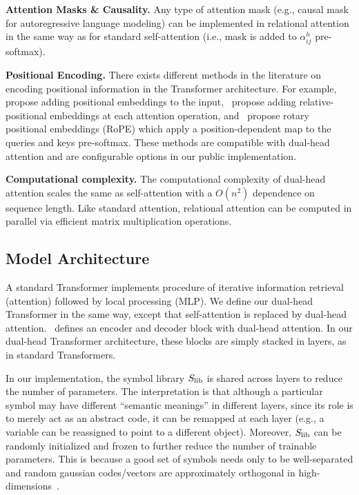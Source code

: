\textbf{Attention Masks \& Causality.} Any type of attention mask (e.g., causal mask for autoregressive language modeling) can be implemented in relational attention in the same way as for standard self-attention (i.e., mask is added to $\alpha_{ij}^h$ pre-softmax).

\textbf{Positional Encoding.} There exists different methods in the literature on encoding positional information in the Transformer architecture. For example,~\citet{vaswani2017attention} propose adding positional embeddings to the input,~\citet{shawSelfAttentionRelativePosition2018b} propose adding relative-positional embeddings at each attention operation, and~\citet{suRoFormerEnhancedTransformer2023} propose rotary positional embeddings (RoPE) which apply a position-dependent map to the queries and keys pre-softmax. These methods are compatible with dual-head attention and are configurable options in our public implementation.

\textbf{Computational complexity.} The computational complexity of dual-head attention scales the same as self-attention with a $O(n^2)$ dependence on sequence length. Like standard attention, relational attention can be computed in parallel via efficient matrix multiplication operations.


\subsection{Model Architecture}

A standard Transformer implements procedure of iterative information retrieval (attention) followed by local processing (MLP). We define our dual-head Transformer in the same way, except that self-attention is replaced by dual-head attention.~ defines an encoder and decoder block with dual-head attention. In our dual-head Transformer architecture, these blocks are simply stacked in layers, as in standard Transformers.

\begin{remark}
    In our implementation, the symbol library $S_\mathrm{lib}$ is shared across layers to reduce the number of parameters. The interpretation is that although a particular symbol may have different ``semantic meanings'' in different layers, since its role is to merely act as an abstract code, it can be remapped at each layer (e.g., a variable can be reassigned to point to a different object). Moreover, $S_\mathrm{lib}$ can be randomly initialized and frozen to further reduce the number of trainable parameters. This is because a good set of symbols needs only to be well-separated and random gaussian codes/vectors are approximately orthogonal in high-dimensions~\citep{needcitation?citationonrandomcodes?}.
\end{remark}

